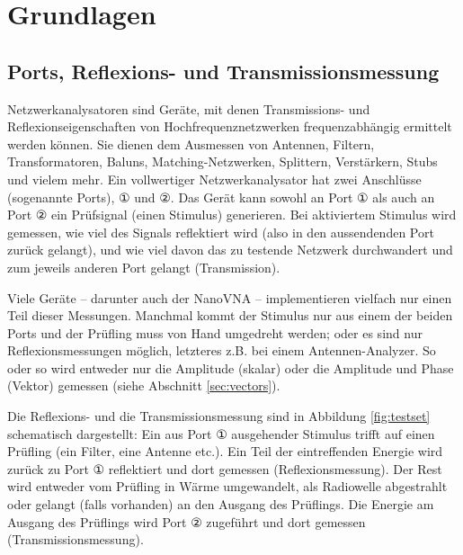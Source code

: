 \documentclass[twoside,a4paper,11pt,halfparskip,DIV=11,notitlepage]{scrartcl}
\begin{document}
\section{Grundlagen}

\subsection{Ports, Reflexions- und Transmissionsmessung}\label{sec:ports}
Netzwerkanalysatoren sind Geräte, mit denen Transmissions- und
Reflexionseigenschaften von Hochfrequenznetzwerken frequenzabhängig ermittelt
werden können. Sie dienen dem Ausmessen von Antennen, Filtern, Transformatoren,
Baluns, Matching-Netzwerken, Splittern, Verstärkern, Stubs und vielem mehr. Ein
vollwertiger Netzwerkanalysator hat zwei Anschlüsse (sogenannte Ports), ① und ②.
Das Gerät kann sowohl an Port ① als auch an Port ② ein Prüfsignal (einen 
Stimulus) generieren. Bei aktiviertem Stimulus wird gemessen, wie viel des
Signals reflektiert wird (also in den aussendenden Port zurück gelangt), und
wie viel davon das zu testende Netzwerk durchwandert und zum jeweils anderen
Port gelangt (Transmission).

Viele Geräte -- darunter auch der NanoVNA -- implementieren vielfach nur einen Teil
dieser Messungen. Manchmal kommt der Stimulus nur aus einem der beiden Ports
und der Prüfling muss von Hand umgedreht werden; oder es sind nur
Reflexionsmessungen möglich, letzteres z.B. bei einem Antennen-Analyzer. So
oder so wird entweder nur die Amplitude (skalar) oder die Amplitude und Phase
(Vektor) gemessen (siehe Abschnitt \ref{sec:vectors}).

Die Reflexions- und die Transmissionsmessung sind in
Abbildung \ref{fig:testset} schematisch dargestellt: Ein aus Port ① ausgehender
Stimulus trifft auf einen Prüfling (ein Filter, eine Antenne etc.). Ein Teil
der eintreffenden Energie wird zurück zu Port ① reflektiert und dort gemessen
(Reflexionsmessung). Der Rest wird entweder vom Prüfling in Wärme umgewandelt,
als Radiowelle abgestrahlt oder gelangt (falls vorhanden) an den Ausgang des
Prüflings. Die Energie am Ausgang des Prüflings wird Port ② zugeführt
und dort gemessen (Transmissionsmessung).
\end{document}
